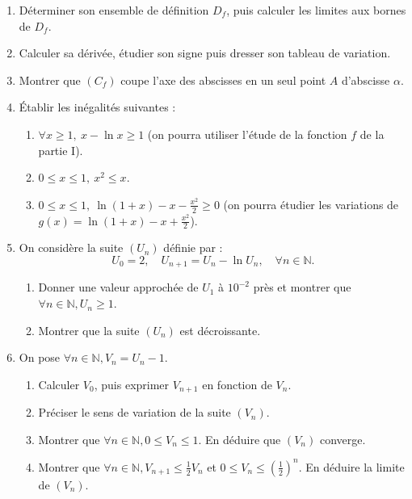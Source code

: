 \documentclass[12pt]{article}
\begin{document}
\begin{enumerate}
    \item Déterminer son ensemble de définition \(D_f\), puis calculer les limites aux bornes de \(D_f\).
    \item Calculer sa dérivée, étudier son signe puis dresser son tableau de variation.
    \item Montrer que \((C_f)\) coupe l’axe des abscisses en un seul point \(A\) d’abscisse \(\alpha\).
    \item Établir les inégalités suivantes :
    \begin{enumerate}
        \item \(\forall x \geq 1, \ x - \ln x \geq 1\) (on pourra utiliser l’étude de la fonction \(f\) de la partie I).
        \item \(0 \leq x \leq 1, \ x^2 \leq x\).
        \item \(0 \leq x \leq 1, \ \ln(1 + x) - x - \frac{x^2}{2} \geq 0\) (on pourra étudier les variations de \(g(x) = \ln(1 + x) - x + \frac{x^2}{2}\)).
    \end{enumerate}

    \item On considère la suite \((U_n)\) définie par :
    \[
    U_0 = 2, \quad U_{n+1} = U_n - \ln U_n, \quad \forall n \in \mathbb{N}.
    \]
    \begin{enumerate}
        \item Donner une valeur approchée de \(U_1\) à \(10^{-2}\) près et montrer que \(\forall n \in \mathbb{N}, U_n \geq 1\).
        \item Montrer que la suite \((U_n)\) est décroissante.
    \end{enumerate}

    \item On pose \(\forall n \in \mathbb{N}, V_n = U_n - 1\).
    \begin{enumerate}
        \item Calculer \(V_0\), puis exprimer \(V_{n+1}\) en fonction de \(V_n\).
        \item Préciser le sens de variation de la suite \((V_n)\).
        \item Montrer que \(\forall n \in \mathbb{N}, 0 \leq V_n \leq 1\). En déduire que \((V_n)\) converge.
        \item Montrer que \(\forall n \in \mathbb{N}, V_{n+1} \leq \frac{1}{2} V_n\) et \(0 \leq V_n \leq \left(\frac{1}{2}\right)^n\). En déduire la limite de \((V_n)\).
    \end{enumerate}
\end{enumerate}
\end{document}
